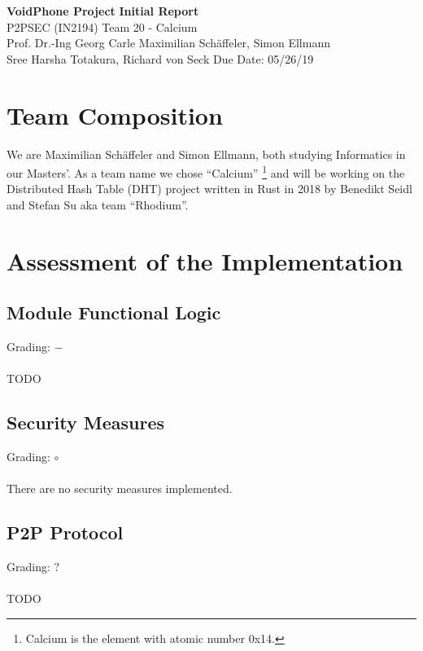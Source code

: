 \documentclass[a4paper, 11pt]{article}
\begin{document}
\noindent
\large\textbf{VoidPhone Project} \hfill \textbf{Initial Report} \\
\normalsize P2PSEC (IN2194)  \hfill Team 20 - Calcium\\
Prof. Dr.-Ing Georg Carle \hfill Maximilian Schäffeler, Simon Ellmann \\
Sree Harsha Totakura, Richard von Seck \hfill Due Date: 05/26/19

%

\section*{Team Composition}
We are Maximilian Schäffeler and Simon Ellmann, both studying Informatics in our Masters'.
As a team name we chose ``Calcium'' \footnote{Calcium is the element with atomic number 0x14.} and will be working on the Distributed Hash Table (DHT) project written in Rust in 2018 by Benedikt Seidl and Stefan Su aka team ``Rhodium''.


\section*{Assessment of the Implementation}
\subsection*{Module Functional Logic}
Grading: $-$\\
\\
TODO


\subsection*{Security Measures}
Grading: $\circ$\\
\\
There are no security measures implemented.


\subsection*{P2P Protocol}
Grading: $?$\\
\\
TODO
\end{document}
